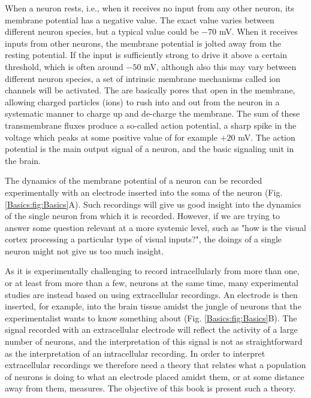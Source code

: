 When a neuron rests, i.e., when it receives no input from any other neuron, its membrane potential has a negative value. The exact value varies between different neuron species, but a typical value could be $-70$ mV. When it receives inputs from other neurons, the membrane potential is jolted away from the resting potential. If the input is sufficiently strong to drive it above a certain threshold, which is often around $-50$ mV, although also this may vary between different neuron species, a set of intrinsic membrane mechanisms called ion channels will be activated. The are basically pores that open in the membrane, allowing charged particles (ions) to rush into and out from the neuron in a systematic manner to charge up and de-charge the membrane. 
The sum of these transmembrane fluxes produce a so-called action potential, a sharp spike in the voltage which peaks at some positive value of for example $+20$ mV. The action potential is the main output signal of a neuron, and the basic signaling unit in the brain.

The dynamics of the membrane potential of a neuron can be recorded experimentally with an electrode inserted into the soma of the neuron (Fig. \ref{Basics:fig:Basics}A). Such recordings will give us good insight into the dynamics of the single neuron from which it is recorded. However, if we are trying to answer some question relevant at a more systemic level, such as "how is the visual cortex processing a particular type of visual inputs?", the doings of a single neuron might not give us too much insight. 

As it is experimentally challenging to record intracellularly from more than one, or at least from more than a few, neurons at the same time, many experimental studies are instead based on using extracellular recordings. An electrode is then inserted, for example, into the brain tissue amidst the jungle of neurons that the experimentalist wants to know something about (Fig. \ref{Basics:fig:Basics}B). The signal recorded with an extracellular electrode will reflect the activity of a large number of neurons, and the interpretation of this signal is not as straightforward as the interpretation of an intracellular recording. In order to interpret extracellular recordings we therefore need a theory that relates what a population of neurons is doing to what an electrode placed amidst them, or at some distance away from them, measures. The objective of this book is present such a theory.





